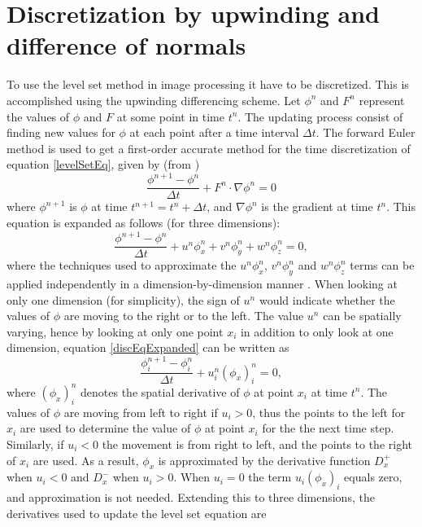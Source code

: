 \section{Discretization by upwinding and difference of normals}
To use the level set method in image processing it have to be discretized. This is accomplished using the upwinding differencing scheme. Let \(\phi^n\) and \(F^n\) represent the values of \(\phi\) and \(F\) at some point in time \(t^n\). The updating process consist of finding new values for \(\phi\) at each point after a time interval \(\Delta t\). The forward Euler method is used to get a first-order accurate method for the time discretization of equation \ref{levelSetEq}, given by (from \cite{osher02})
\begin{equation}
\frac{\phi^{n+1}-\phi^n}{\Delta t} + F^n \cdot \nabla \phi^n = 0
\label{discEq}
\end{equation}
where \(\phi^{n+1}\) is \(\phi\) at time \(t^{n+1} = t^n + \Delta t\), and \(\nabla \phi^n\) is the gradient at time \(t^n\). This equation is expanded as follows (for three dimensions):
\begin{equation}
\frac{\phi^{n+1}-\phi^n}{\Delta t} + u^n \phi_x^n + v^n \phi_y^n + w^n \phi_z^n= 0,
\label{discEqExpanded}
\end{equation}
where the techniques used to approximate the \(u^n \phi_x^n\), \(v^n \phi_y^n \) and \(w^n \phi_z^n\) terms can be applied independently in a dimension-by-dimension manner \cite{osher02}. When looking at only one dimension (for simplicity), the sign of \(u^n\) would indicate whether the values of \(\phi\) are moving to the right or to the left. The value \(u^n\) can be spatially varying, hence by looking at only one point \(x_i\) in addition to only look at one dimension, equation \ref{discEqExpanded} can be written as
\begin{equation}
\frac{\phi_i^{n+1}-\phi_i^n}{\Delta t} + u_i^n (\phi_x)_i^n = 0,
\label{discEq1DPoint}
\end{equation}  
where \((\phi_x)_i^n\) denotes the spatial derivative of \(\phi\) at point \(x_i\) at time \(t^n\). The values of \(\phi\) are moving from left to right if \(u_i > 0\), thus the points to the left for \(x_i\) are used to determine the value of \(\phi\) at point \(x_i\) for the the next time step. Similarly, if \(u_i < 0\) the movement is from right to left, and the points to the right of \(x_i\) are used. As a result, \(\phi_x\) is approximated by the derivative function \(D_x^+\) when \(u_i < 0\) and \(D_x^-\) when \(u_i > 0\). When \(u_i = 0\) the term \(u_i(\phi_x)_i\) equals zero, and approximation is not needed. Extending this to three dimensions, the derivatives used to update the level set equation are 
